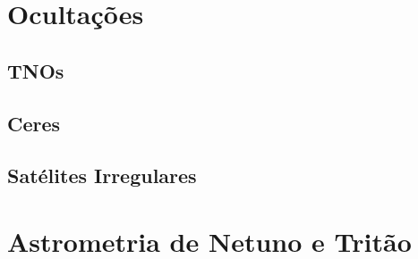 \documentclass[12pt,a4paper]{monografia}
\begin{document}
\chapter{Ocultações}
\label{Cap: observacoes}

\section{TNOs}
\label{Sec: TNOs}

\section{Ceres}
\label{Sec: Ceres}

\section{Satélites Irregulares}
\label{Sec: Irregulares}

\chapter{Astrometria de Netuno e Tritão}
\label{Cap: Netuno}


%
%
%
%
%



\glsaddall
\printglossary



\end{document}
